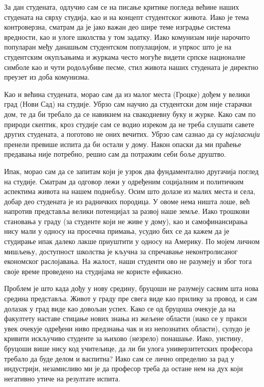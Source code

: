 \documentclass[b5paper]{article}
\begin{document}
\large

За дан студената, одлучио сам се на писање критике погледа већине наших студената на сврху студија, као и на концепт студентског живота. Иако је тема контроверзна, сматрам да је јако важан део шире теме изградње система вредности, као и улоге школства у том задатку. Иако комунизам није нарочито популаран међу данашњом студентском популацијом, и упркос што је на студентским окупљањима и журкама често могуће видети српске националне симболе као и чути родољубиве песме, стил живота наших студената је директно преузет из доба комунизма.

Као и већина студената, морао сам да из малог места (Гроцке) дођем у велики град (Нови Сад) на студије. Убрзо сам научио да студентски дом није старачки дом, те да би требало да се навикнем на свакодневну буку и журке. Како сам по природи скептик, кроз студије сам се водио изреком да не треба слушати савете других студената, а поготово не оних вечитих. Убрзо сам сазнао да су \textit{најгласнији} пренели превише испита да би остали у дому. Након опаски да ми праћење предавања није потребно, решио сам да потражим себи боље друштво.

Ипак, морао сам да се запитам који је узрок два фундаментално другачија поглед на студије. Сматрам да одговор лежи у одређеним социјалним и политичким аспектима живота на нашем поднебљу. Осим што долазе из малих места и села, добар део студената је из радничких породица. У овоме нема ништа лоше, већ напротив представља велики потенцијал за развој наше земље. Иако трошкови становања у граду (за студенте који не живе у дому), као и самофинансирања нису мали у односу на просечна примања, усудио бих се да кажем да је студирање ипак далеко лакше приуштити у односу на Америку. По мојем личном мишљењу, доступност школства је кључна за спречавање неконтролисаног економског раслојавања. На жалост, наши студенти ово не разумеју и због тога своје време проведено на студијама не користе ефикасно.

Проблем је што када дођу у нову средину, бруцоши не разумеју сасвим шта нова средина представља. Живот у граду пре свега виде као прилику за провод, и сам долазак у град виде као довољан успех. Како се од бруцоша очекује да на факултету наставе стицање нових знања из жељене области (иако се у пракси увек очекује одређени ниво предзнања чак и из непознатих области), сулудо је кривити искључиво студенте за њихово (незрело) понашање. Иако, уистину, бруцоши више нису код учитељице, да ли би улога универзитетских професора требало да буде делом и васпитна? Иако сам се лично определио за рад у индустрији, незамисливо ми је да професор треба да остане нем на дух који негативно утиче на резултате испита.
\end{document}
